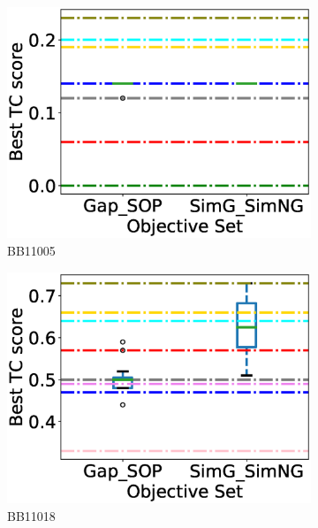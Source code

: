 \begin{figure}[!htbp]
\begin{adjustwidth}{-1cm}{-1cm}
\begin{subfigure}{0.26\textwidth}
			\includegraphics[width=\columnwidth]{Figure/summary/precomputedInit/Balibase/BB11005_objset_tc_rank_2}
			\caption{BB11005}
\end{subfigure}    
		\begin{subfigure}{0.26\textwidth}
			\includegraphics[width=\columnwidth]{Figure/summary/precomputedInit/Balibase/BB11018_objset_tc_rank_2}
			\caption{BB11018}
\end{subfigure}
		\begin{subfigure}{0.26\textwidth}

\end{subfigure}
\end{adjustwidth}
\end{figure}
